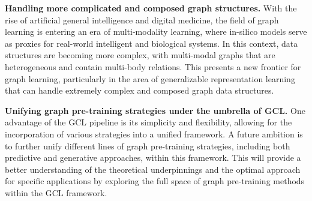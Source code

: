 \documentclass[11pt]{article}
\begin{document}
\textbf{Handling more complicated and composed graph structures.}
With the rise of artificial general intelligence and digital medicine, the field of graph learning is entering an era of multi-modality learning, where in-silico models serve as proxies for real-world intelligent and biological systems. In this context, data structures are becoming more complex, with multi-modal graphs that are heterogeneous and contain multi-body relations. This presents a new frontier for graph learning, particularly in the area of generalizable representation learning that can handle extremely complex and composed graph data structures.

\textbf{Unifying graph pre-training strategies under the umbrella of GCL.}
One advantage of the GCL pipeline is its simplicity and flexibility, allowing for the incorporation of various strategies into a unified framework. A future ambition is to further unify different lines of graph pre-training strategies, including both predictive and generative approaches, within this framework. This will provide a better understanding of the theoretical underpinnings and the optimal approach for specific applications by exploring the full space of graph pre-training methods within the GCL framework.



\end{document}
